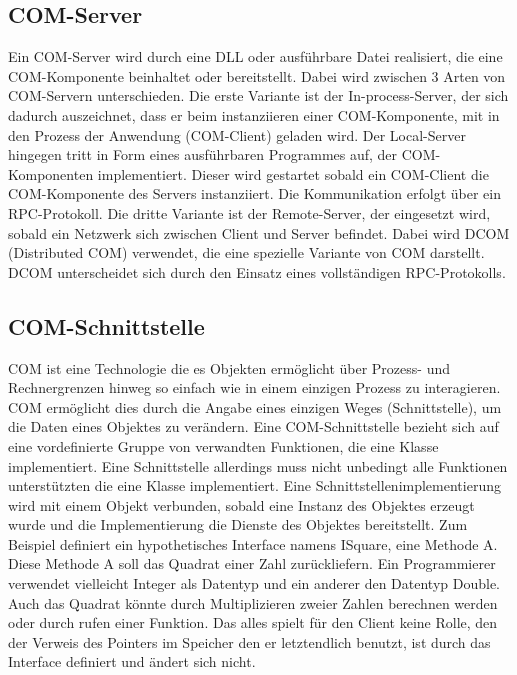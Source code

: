 \subsection{COM-Server}
\label{ch:grundlagen:sec:ComponentObjectModel:subsec:COMServer}

Ein COM-Server wird durch eine DLL oder ausführbare Datei realisiert, die eine COM-Komponente beinhaltet oder bereitstellt. Dabei wird zwischen 3 Arten von COM-Servern unterschieden. Die erste Variante ist der In-process-Server, der sich dadurch auszeichnet, dass er beim instanziieren einer COM-Komponente, mit in den Prozess der Anwendung (COM-Client) geladen wird. Der Local-Server hingegen tritt in Form eines ausführbaren Programmes auf, der COM-Komponenten implementiert. Dieser wird gestartet sobald ein COM-Client die COM-Komponente des Servers instanziiert. Die Kommunikation erfolgt über ein RPC-Protokoll. Die dritte Variante ist der Remote-Server, der eingesetzt wird, sobald ein Netzwerk sich zwischen Client und Server befindet. Dabei wird DCOM (Distributed COM) verwendet, die eine spezielle Variante von COM darstellt. DCOM unterscheidet sich durch den Einsatz eines vollständigen RPC-Protokolls. 
 
\subsection{COM-Schnittstelle}
\label{ch:grundlagen:sec:ComponentObjectModel:subsec:COMSchnittstelle}

COM ist eine Technologie die es Objekten ermöglicht über Prozess- und Rechnergrenzen hinweg so einfach wie in einem einzigen Prozess zu interagieren. COM ermöglicht dies durch die Angabe eines einzigen Weges (Schnittstelle), um die Daten eines Objektes zu verändern. Eine COM-Schnittstelle bezieht sich auf eine vordefinierte Gruppe von verwandten Funktionen, die eine Klasse implementiert. Eine Schnittstelle allerdings muss nicht unbedingt alle Funktionen unterstützten die eine Klasse implementiert. Eine Schnittstellenimplementierung wird mit einem Objekt verbunden, sobald eine Instanz des Objektes erzeugt wurde und die Implementierung die Dienste des Objektes bereitstellt. Zum Beispiel definiert ein hypothetisches Interface namens ISquare, eine Methode A. Diese Methode A soll das Quadrat einer Zahl zurückliefern. Ein Programmierer verwendet vielleicht Integer als Datentyp und ein anderer den Datentyp Double. Auch das Quadrat könnte durch Multiplizieren zweier Zahlen berechnen werden oder durch rufen einer Funktion. Das alles spielt für den Client keine Rolle, den der Verweis des Pointers im Speicher den er letztendlich benutzt, ist durch das Interface definiert und ändert sich nicht. 

